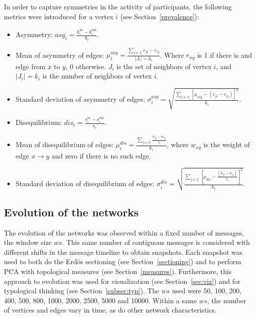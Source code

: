\documentclass[%
 aip,
 jmp,%
 amsmath,amssymb,
 reprint,%
]{revtex4-1}
\begin{document}
In order to capture symmetries in the activity of participants, the following metrics were introduced for a vertex $i$ (see Section~\ref{prevalence}):

\begin{itemize}
    \item Asymmetry: $asy_i=\frac{k_i^{in}-k_i^{out}}{k_i}$.
    \item Mean of asymmetry of edges: $\mu_i^{asy}=\frac{\sum_{j\in J_i} e_{ji}-e_{ij}}{|J_i|=k_i}$. Where $e_{xy}$ is 1 if there is and edge from $x$ to $y$, $0$ otherwise. $J_i$ is the set of neighbors of vertex $i$, and $|J_i|=k_i$ is the number of neighbors of vertex $i$.
    \item Standard deviation of asymmetry of edges: $\sigma_i^{asy}=\sqrt{\frac{\sum_{j\in J_i}[\mu_{asy} -(e_{ji}-e_{ij}) ]^2  }{k_i}  }$.
    \item Disequilibrium: $dis_i=\frac{s_i^{in}-s_i^{out}}{s_i}$.
    \item Mean of disequilibrium of edges: $\mu_i^{dis}=\frac{\sum_{j \in J_i}\frac{w_{ji}-w_{ij}}{s_i}}{k_i}$, where $w_{xy}$ is the weight of edge $x\rightarrow y$ and zero if there is no such edge.
    \item Standard deviation of disequilibrium of edges: $\sigma_i^{dis}=\sqrt{\frac{\sum_{j\in J_i}[\mu_{dis}-\frac{(w_{ji}-w_{ij})}{s_i}]^2}{k_i}}$.
\end{itemize}

\subsection{Evolution of the networks}
   The evolution of the networks was observed within a fixed number of messages, the window size $ws$. This same number of contiguous messages is considered with different shifts in the message timeline to obtain snapshots. Each snapshot was used to both do the Erd\"os sectioning (see Section~\ref{sectioning}) and to perform PCA with topological measures (see Section~\ref{measures}). Furthermore, this approach to evolution was used for visualization (see Section~\ref{sec:viz}) and for typological thinking (see Section~\ref{subsec:typ}).
The $ws$ used were 50, 100, 200, 400, 500, 800, 1000, 2000, 2500, 5000 and 10000. Within a same $ws$, the number of vertices and edges vary in time, as do other network characteristics. 
\end{document}
